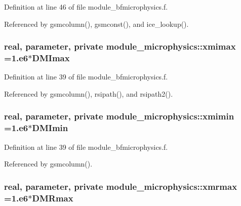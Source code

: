 Definition at line 46 of file module\+\_\+bfmicrophysics.\+f.



Referenced by gsmcolumn(), gsmconst(), and ice\+\_\+lookup().

\subsubsection[{\texorpdfstring{xmimax}{xmimax}}]{\setlength{\rightskip}{0pt plus 5cm}real, parameter, private module\+\_\+microphysics\+::xmimax =1.e6$\ast$D\+M\+Imax\hspace{0.3cm}{\ttfamily [private]}}\hypertarget{namespacemodule__microphysics_ae678585401e3fd39ce21f225ae430677}{}\label{namespacemodule__microphysics_ae678585401e3fd39ce21f225ae430677}


Definition at line 39 of file module\+\_\+bfmicrophysics.\+f.



Referenced by gsmcolumn(), rsipath(), and rsipath2().

\subsubsection[{\texorpdfstring{xmimin}{xmimin}}]{\setlength{\rightskip}{0pt plus 5cm}real, parameter, private module\+\_\+microphysics\+::xmimin =1.e6$\ast$D\+M\+Imin\hspace{0.3cm}{\ttfamily [private]}}\hypertarget{namespacemodule__microphysics_ac355dc0d92140f99522cb35dc025e9b3}{}\label{namespacemodule__microphysics_ac355dc0d92140f99522cb35dc025e9b3}


Definition at line 39 of file module\+\_\+bfmicrophysics.\+f.



Referenced by gsmcolumn().

\subsubsection[{\texorpdfstring{xmrmax}{xmrmax}}]{\setlength{\rightskip}{0pt plus 5cm}real, parameter, private module\+\_\+microphysics\+::xmrmax =1.e6$\ast$D\+M\+Rmax\hspace{0.3cm}{\ttfamily [private]}}\hypertarget{namespacemodule__microphysics_ad2c7abf18a4c75103e965cb9c856e6f7}{}\label{namespacemodule__microphysics_ad2c7abf18a4c75103e965cb9c856e6f7}


